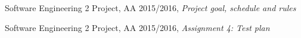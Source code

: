 \begin{thebibliography}{1}
    	Software Engineering 2 Project, AA 2015/2016, \emph{Project goal, schedule and rules}

    	Software Engineering 2 Project, AA 2015/2016, \emph{Assignment 4: Test plan}

\end{thebibliography}
